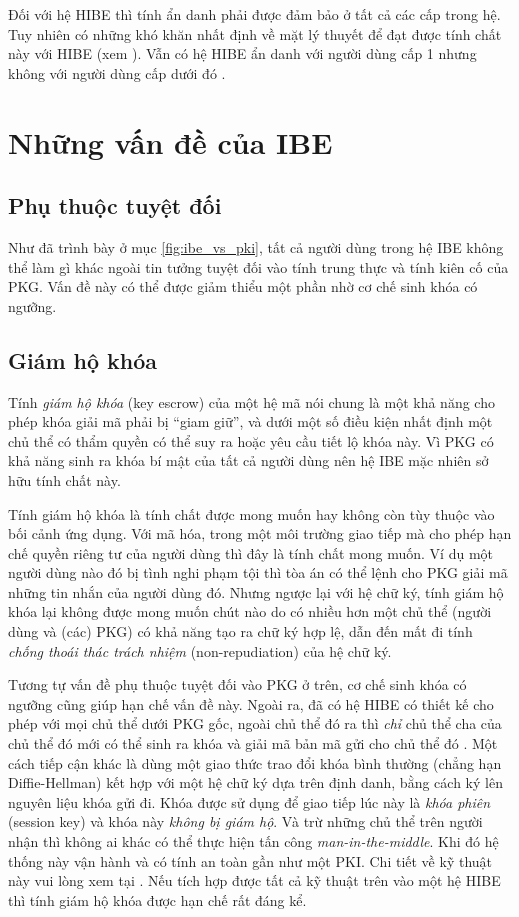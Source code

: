 \documentclass[class=report, crop=false]{standalone}
\begin{document}
			Đối với hệ HIBE thì tính ẩn danh phải được đảm bảo ở tất cả các cấp trong hệ. Tuy nhiên có những khó khăn nhất định về mặt lý thuyết để đạt được tính chất này với HIBE (xem \cite{DBLP:conf/crypto/BoyenW06}). Vẫn có hệ HIBE ẩn danh với người dùng cấp 1 nhưng không với người dùng cấp dưới đó \cite{DBLP:conf/asiacrypt/GentryS02}.
	\section{Những vấn đề của IBE}
		\subsection{Phụ thuộc tuyệt đối}
			Như đã trình bày ở mục \ref{fig:ibe_vs_pki}, tất cả người dùng trong hệ IBE không thể làm gì khác ngoài tin tưởng tuyệt đối vào tính trung thực và tính kiên cố của PKG. Vấn đề này có thể được giảm thiểu một phần nhờ cơ chế sinh khóa có ngưỡng.
		\subsection{Giám hộ khóa}\label{subsec:key_escrow}
			Tính \textit{giám hộ khóa} (key escrow) của một hệ mã nói chung là một khả năng cho phép khóa giải mã phải bị ``giam giữ'', và dưới một số điều kiện nhất định một chủ thể có thẩm quyền có thể suy ra hoặc yêu cầu tiết lộ khóa này. Vì PKG có khả năng sinh ra khóa bí mật của tất cả người dùng nên hệ IBE mặc nhiên sở hữu tính chất này.

			Tính giám hộ khóa là tính chất được mong muốn hay không còn tùy thuộc vào bối cảnh ứng dụng. Với mã hóa, trong một môi trường giao tiếp mà cho phép hạn chế quyền riêng tư của người dùng thì đây là tính chất mong muốn. Ví dụ một người dùng nào đó bị tình nghi phạm tội thì tòa án có thể lệnh cho PKG giải mã những tin nhắn của người dùng đó. Nhưng ngược lại với hệ chữ ký, tính giám hộ khóa lại không được mong muốn chút nào do có nhiều hơn một chủ thể (người dùng và (các) PKG) có khả năng tạo ra chữ ký hợp lệ, dẫn đến mất đi tính \textit{chống thoái thác trách nhiệm} (non-repudiation) của hệ chữ ký.

			Tương tự vấn đề phụ thuộc tuyệt đối vào PKG ở trên, cơ chế sinh khóa có ngưỡng cũng giúp hạn chế vấn đề này. Ngoài ra, đã có hệ HIBE có thiết kế cho phép với mọi chủ thể dưới PKG gốc, ngoài chủ thể đó ra thì \emph{chỉ} chủ thể cha của chủ thể đó mới có thể sinh ra khóa và giải mã bản mã gửi cho chủ thể đó \cite[mục 6.1]{DBLP:conf/asiacrypt/GentryS02}. Một cách tiếp cận khác là dùng một giao thức trao đổi khóa bình thường (chẳng hạn Diffie-Hellman) kết hợp với một hệ chữ ký dựa trên định danh, bằng cách ký lên nguyên liệu khóa gửi đi. Khóa được sử dụng để giao tiếp lúc này là \textit{khóa phiên} (session key) và khóa này \emph{không bị giám hộ}. Và trừ những chủ thể trên người nhận thì không ai khác có thể thực hiện tấn công \textit{man-in-the-middle}. Khi đó hệ thống này vận hành và có tính an toàn gần như một PKI. Chi tiết về kỹ thuật này vui lòng xem tại \cite[mục 6.2]{DBLP:conf/asiacrypt/GentryS02}. Nếu tích hợp được tất cả kỹ thuật trên vào một hệ HIBE thì tính giám hộ khóa được hạn chế rất đáng kể.
\end{document}
